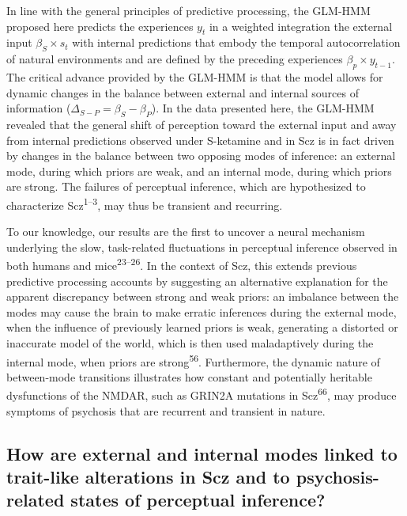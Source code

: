 \documentclass[
]{article}
\begin{document}
In line with the general principles of predictive processing, the
GLM-HMM proposed here predicts the experiences \(y_t\) in a weighted
integration the external input \(\beta_S \times s_t\) with internal
predictions that embody the temporal autocorrelation of natural
environments and are defined by the preceding experiences
\(\beta_p \times y_{t-1}\). The critical advance provided by the GLM-HMM
is that the model allows for dynamic changes in the balance between
external and internal sources of information
(\(\Delta_{S-P} = \beta_S - \beta_P\)). In the data presented here, the
GLM-HMM revealed that the general shift of perception toward the
external input and away from internal predictions observed under
S-ketamine and in Scz is in fact driven by changes in the balance
between two opposing modes of inference: an external mode, during which
priors are weak, and an internal mode, during which priors are strong.
The failures of perceptual inference, which are hypothesized to
characterize Scz\textsuperscript{1--3}, may thus be transient and
recurring.

To our knowledge, our results are the first to uncover a neural
mechanism underlying the slow, task-related fluctuations in perceptual
inference observed in both humans and mice\textsuperscript{23--26}. In
the context of Scz, this extends previous predictive processing accounts
by suggesting an alternative explanation for the apparent discrepancy
between strong and weak priors: an imbalance between the modes may cause
the brain to make erratic inferences during the external mode, when the
influence of previously learned priors is weak, generating a distorted
or inaccurate model of the world, which is then used maladaptively
during the internal mode, when priors are strong\textsuperscript{56}.
Furthermore, the dynamic nature of between-mode transitions illustrates
how constant and potentially heritable dysfunctions of the NMDAR, such
as GRIN2A mutations in Scz\textsuperscript{66}, may produce symptoms of
psychosis that are recurrent and transient in nature.

\subsection{How are external and internal modes linked to trait-like
alterations in Scz and to psychosis-related states of perceptual
inference?}\label{how-are-external-and-internal-modes-linked-to-trait-like-alterations-in-scz-and-to-psychosis-related-states-of-perceptual-inference}
\end{document}
